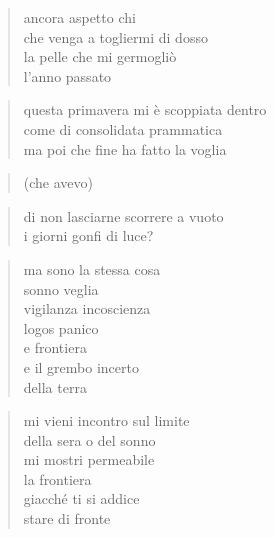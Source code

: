 \clearpage


\begin{verse}
    ancora aspetto chi\\
    che venga a togliermi di dosso\\
    la pelle che mi germogliò\\
    l'anno passato
\end{verse}

\clearpage


\begin{verse}
    questa primavera mi è scoppiata dentro\\
    come di consolidata prammatica\\
    ma poi che fine ha fatto la voglia
\end{verse}

\begin{verse}
    (che avevo)
\end{verse}

\begin{verse}
    di non lasciarne scorrere a vuoto\\
    i giorni gonfi di luce?
\end{verse}

\clearpage


\begin{verse}
    ma sono la stessa cosa\\
    sonno veglia\\
    vigilanza incoscienza\\
    logos panico\\
    e frontiera\\
    e il grembo incerto\\
    della terra
\end{verse}

\clearpage


\begin{verse}
    mi vieni incontro sul limite\\
    della sera o del sonno\\
    mi mostri permeabile\\
    la frontiera\\
    giacché ti si addice\\
    stare di fronte
\end{verse}

